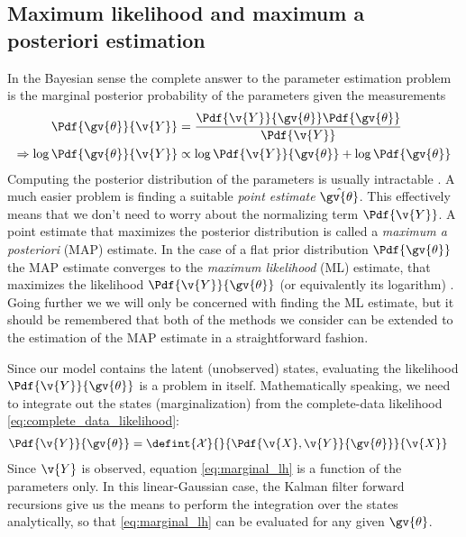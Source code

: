 \subsection{Maximum likelihood and maximum a posteriori estimation}

In the Bayesian sense the complete answer to the parameter estimation
problem is the marginal posterior probability of the parameters
given the measurements
\begin{align}
\begin{split}
	\Pdf{\gv{\theta}}{\v{Y}}&=\frac{\Pdf{\v{Y}}{\gv{\theta}}\Pdf{\gv{\theta}}}{\Pdf{\v{Y}}}\\
	\Rightarrow \log\Pdf{\gv{\theta}}{\v{Y}}&\propto \log \Pdf{\v{Y}}{\gv{\theta}} + \log\Pdf{\gv{\theta}}
	\label{eq:param_post}
\end{split}
\end{align}
Computing the posterior distribution of the parameters is usually intractable . A much
easier problem is finding a suitable \emph{point estimate} $\hat{\gv{\theta}}$.
This effectively means that we don't need to worry about the normalizing
term $\Pdf{\v{Y}}$. A point estimate that maximizes the posterior distribution
is called a \emph{maximum a posteriori} (MAP) estimate. In the case of a flat
prior distribution $\Pdf{\gv{\theta}}$ the MAP estimate converges to the
\emph{maximum likelihood} (ML) estimate, that maximizes the likelihood
$\Pdf{\v{Y}}{\gv{\theta}}$ (or equivalently its logarithm) . Going further
we we will only be concerned with finding the ML estimate, but it should
be remembered that both of the methods we consider can be extended
to the estimation of the MAP estimate in a straightforward fashion.

Since our model contains the latent (unobserved) states, evaluating the likelihood 
$\Pdf{\v{Y}}{\gv{\theta}}$ is a problem in itself. Mathematically speaking,
we need to integrate out the states (marginalization) from 
the complete-data likelihood \eqref{eq:complete_data_likelihood}:
\begin{align}
	\Pdf{\v{Y}}{\gv{\theta}}&=\defint{\mathcal{X}}{}{\Pdf{\v{X},\v{Y}}{\gv{\theta}}}{\v{X}}
	\label{eq:marginal_lh}
\end{align}
Since $\v{Y}$ is observed, equation \eqref{eq:marginal_lh} is a function of the
parameters only. In this linear-Gaussian case, the Kalman filter forward recursions give us the 
means to perform the integration over the states analytically, so that \eqref{eq:marginal_lh}
can be evaluated for any given $\gv{\theta}$.

